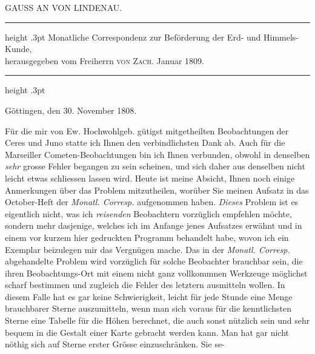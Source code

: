\par\clearpage
{}
\begingroup
\pagestyle{empty}
\thispagestyle{empty}
%
\vspace*{.24\textheight}
\begin{center}
GAUSS AN VON LINDENAU.
\end{center}
\begin{center}
\parbox{.78\linewidth}{%
  \centering\fontsize{8}{10}\selectfont\frenchspacing
  \hrule height .3pt\relax\vspace{3pt}
  Monatliche Correspondenz zur Beförderung der Erd- und Himmels-Kunde,\\
  herausgegeben vom Freiherrn \textsc{von Zach}. Januar 1809.\par
  \vspace{3pt}\hrule height .3pt\relax
}
\end{center}
\begin{flushright}Göttingen, den 30. November 1808.\end{flushright}
\par\indent Für die mir von Ew. Hochwohlgeb. gütigst mitgetheilten Beobachtungen der Ceres und Juno statte ich Ihnen den verbindlichsten Dank ab. Auch für die Marseiller Cometen-Beobachtungen bin ich Ihnen verbunden, obwohl in denselben \emph{sehr} grosse Fehler begangen zu sein scheinen, und sich daher aus denselben nicht leicht etwas schliessen lassen wird. Heute ist meine Absicht, Ihnen noch einige Anmerkungen über das Problem mitzutheilen, worüber Sie meinen Aufsatz in das October-Heft der \emph{Monatl. Corresp.} aufgenommen haben. \emph{Dieses} Problem ist es eigentlich nicht, was ich \emph{reisenden} Beobachtern vorzüglich empfehlen möchte, sondern mehr dasjenige, welches ich im Anfange jenes Aufsatzes erwähnt und in einem vor kurzem hier gedruckten Programm behandelt habe, wovon ich ein Exemplar beizulegen mir das Vergnügen mache. Das in der \emph{Monatl. Corresp.} abgehandelte Problem wird vorzüglich für solche Beobachter brauchbar sein, die ihren Beobachtungs-Ort mit einem nicht ganz vollkommnen Werkzeuge möglichst scharf bestimmen und zugleich die Fehler des letztern ausmitteln wollen. In diesem Falle hat es gar keine Schwierigkeit, leicht für jede Stunde eine Menge brauchbarer Sterne auszumitteln, wenn man sich voraus für die kenntlichsten Sterne eine Tabelle für die Höhen berechnet, die auch sonst nützlich sein und sehr bequem in die Gestalt einer Karte gebracht werden kann. Man hat gar nicht nöthig sich auf Sterne erster Grösse einzuschränken. Sie se-
